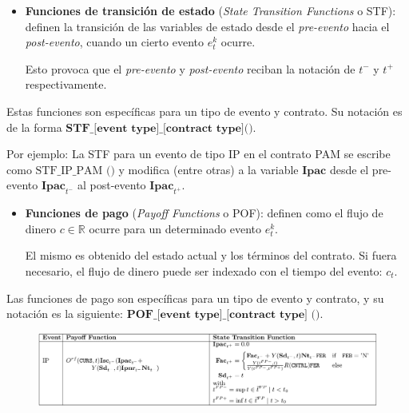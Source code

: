 \documentclass{beamer}
\newcommand{\nologo}{\setbeamertemplate{logo}{}} %
\begin{document}
\begin{frame}
    \begin{itemize}
        \item \textbf{Funciones de transición de estado} (\textit{State Transition Functions} o STF): definen la transición de las variables de estado desde el \textit{pre-evento} hacia el \textit{post-evento}, cuando un cierto evento $e^k_t$ ocurre. 

            Esto provoca que el \textit{pre-evento} y \textit{post-evento} reciban la notación de $t^-$ y $t^+$ respectivamente.

  \end{itemize}
  \pause
  \vfill
  Estas funciones son específicas para un tipo de evento y contrato. Su notación es de la forma $\textbf{STF\_[event type]\_[contract type]()}$.
  \vfill
  \pause

  Por ejemplo: La STF para un evento de tipo IP en el contrato PAM se escribe como $\text{STF\_IP\_PAM ()}$ y modifica (entre otras) a la variable $\textbf{Ipac}$ desde el pre-evento $\textbf{Ipac}_{t^-}$ al post-evento $\textbf{Ipac}_{t^+}$.

\end{frame}

{\nologo
\begin{frame}[fragile]
    \begin{itemize}
        \item \textbf{Funciones de pago} (\textit{Payoff Functions} o POF): definen como el flujo de dinero $c \in\mathbb{R}$ ocurre para un determinado evento $e^k_t$. 

            El mismo es obtenido del estado actual y los términos del contrato. Si fuera necesario, el flujo de dinero puede ser indexado con el tiempo del evento: $c_t$.
    \end{itemize}
    \pause
    \vfill

    Las funciones de pago son específicas para un tipo de evento y contrato, y su notación es la siguiente: $\textbf{POF\_[event type]\_[contract type] ()}$.
    \vfill
    \pause

    \begin{figure}[H]
        \centering
        \includegraphics[width=\textwidth]{POF_STF_IP_PAM.png}
    \end{figure}

\end{frame}
}
\end{document}
